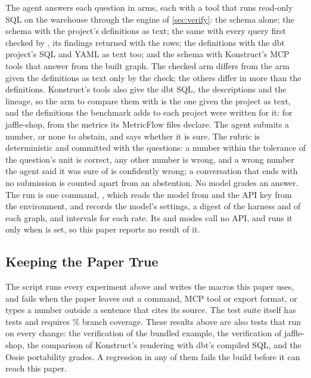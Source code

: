 The agent answers each question in \answerArms{} arms, each with a tool that runs read-only SQL on
the warehouse through the engine of \cref{sec:verify}: the schema alone; the schema with the
project's definitions as text; the same with every query first checked by ,
its findings returned with the rows; the definitions with the dbt project's SQL and YAML as text
too; and the schema with Konstruct's MCP tools that answer from the built graph. The checked arm
differs from the arm given the definitions as text only by the check; the others differ in more than
the definitions. Konstruct's tools also give the dbt SQL, the descriptions and the lineage, so the
arm to compare them with is the one given the project as text, and the definitions the benchmark
adds to each project were written for it: for jaffle-shop, from the metrics its MetricFlow files
declare. The agent submits a number, or none to abstain, and says whether it is sure. The rubric is
deterministic and committed with the questions: a number within the tolerance of the question's unit
is correct, any other number is wrong, and a wrong number the agent said it was sure of is
confidently wrong; a conversation that ends with no submission is counted apart from an abstention.
No model grades an answer. The run is one command,
, which reads the model from
 and the API key from the environment, and records the model's
settings, a digest of the harness and of each graph, and intervals for each rate. Its 
and  modes call no API, and  runs it only when
 is set, so this paper reports no result of it.

\subsection{Keeping the Paper True}

The script  runs every experiment above and writes the macros this paper
uses, and
 fails when the paper leaves out a command, MCP tool or export format, or
types a number outside a sentence that cites its source. The test suite itself has
\testCount{} tests and requires \coverageFloor\% branch coverage. These results above are also
tests that run on every change: the verification of the bundled example, the verification of
jaffle-shop, the comparison of Konstruct's rendering with dbt's compiled SQL, and the Ossie
portability grades. A regression in any of them fails the build before it can reach this paper.

